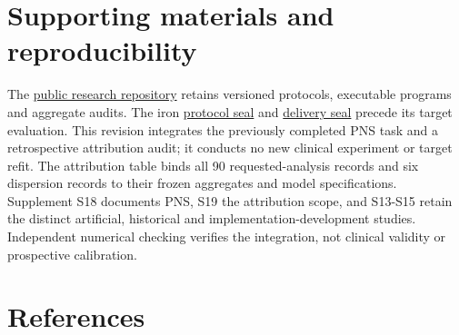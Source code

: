 \documentclass[11pt,letterpaper]{article}
\begin{document}
\section*{Supporting materials and reproducibility}

The \href{https://github.com/ziwang11112/evidence-guided-virtual-cohorts-2026}{public research repository} retains versioned protocols, executable programs and aggregate audits. The iron \href{https://github.com/ziwang11112/evidence-guided-virtual-cohorts-2026/commit/bedd845768c1c938768f58fce685f53cbf97f3df}{protocol seal} and \href{https://github.com/ziwang11112/evidence-guided-virtual-cohorts-2026/commit/c88192edeb0bc63b60d0bfe6e3a7282ced9d2975}{delivery seal} precede its target evaluation. This revision integrates the previously completed PNS task and a retrospective attribution audit; it conducts no new clinical experiment or target refit. The attribution table binds all 90 requested-analysis records and six dispersion records to their frozen aggregates and model specifications. Supplement S18 documents PNS, S19 the attribution scope, and S13-S15 retain the distinct artificial, historical and implementation-development studies. Independent numerical checking verifies the integration, not clinical validity or prospective calibration.


\clearpage

\section*{References}

\begingroup
\end{document}
